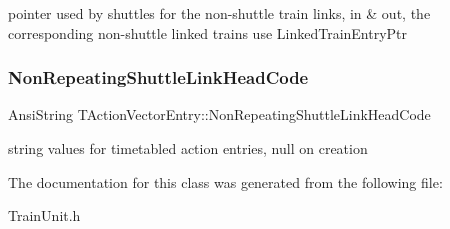 pointer used by shuttles for the non-\/shuttle train links, in \& out, the corresponding non-\/shuttle linked trains use Linked\+Train\+Entry\+Ptr \mbox{\label{class_t_action_vector_entry_ae142e8e9d3a842c9b1d81bcd4e93e291}} 
\subsubsection{\texorpdfstring{Non\+Repeating\+Shuttle\+Link\+Head\+Code}{NonRepeatingShuttleLinkHeadCode}}
{\footnotesize\ttfamily Ansi\+String T\+Action\+Vector\+Entry\+::\+Non\+Repeating\+Shuttle\+Link\+Head\+Code}

string values for timetabled action entries, null on creation 

The documentation for this class was generated from the following file\+:\begin{DoxyCompactItemize}
\item 
Train\+Unit.\+h\end{DoxyCompactItemize}
